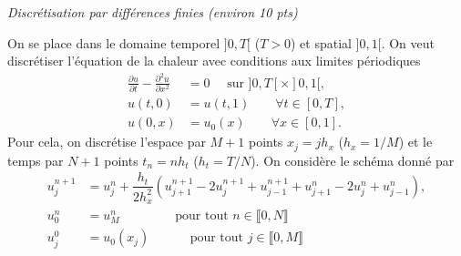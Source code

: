 \documentclass[12pt]{article}
\begin{document}
\newpage
\begin{exo}
  \textit{Discr\'etisation par diff\'erences finies (environ 10 pts)}

  On se place dans le domaine temporel $]0,T[$ ($T > 0$) et spatial $]0,1[$.
  On veut discr\'etiser l'\'equation de la chaleur avec conditions aux limites p\'eriodiques
  \begin{align*}
    \frac{\partial u}{\partial t} - \frac{\partial^2 u}{\partial x^2}
    &= 0 \quad \text{ sur } ]0,T[ \times ]0,1[ ,
    \\
    u(t,0)
    &= u(t,1) \qquad \forall t \in [0,T] ,
    \\
    u(0,x)
    &= u_0(x) \qquad \forall x \in [0,1] .
  \end{align*}
  Pour cela, on discr\'etise l'espace par $M+1$ points $x_j = jh_x$ ($h_x = 1/M$)
  et le temps par $N+1$ points $t_n = n h_t$ ($h_t = T/N$).
  On consid\`ere le sch\'ema donn\'e par
  \begin{align*}
    u_{j}^{n+1}
    &= u_j^n + \dfrac{h_t}{2 h_x^2} ( u_{j+1}^{n+1} - 2 u_{j}^{n+1} + u_{j-1}^{n+1} + u_{j+1}^{n} - 2 u_{j}^n + u_{j-1}^{n} ) ,
    \\
    u_0^n
    &= u_M^n \qquad \qquad \text{ pour tout } n \in \llbracket 0, N \rrbracket
    \\
    u_j^0
    &= u_0(x_j) \qquad \;\;\;\! \text{ pour tout } j \in \llbracket 0,M \rrbracket
  \end{align*}


\end{exo}
\end{document}
